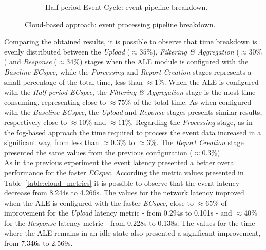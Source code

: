 \begin{figure}[ht!]
\begin{subfigure}{.5\textwidth}
    \caption{Half-period Event Cycle: event pipeline breakdown.}
    \label{fig:ecspecf_effective_half}
  \end{subfigure}
  \caption[Cloud-based approach: event processing breakdown.]{Cloud-based approach: event processing pipeline breakdown.}
  \label{fig:ecspecf_effective_breakdown}
\end{figure}

Comparing the obtained results, it is possible to observe that time breakdown is evenly distributed
between the \textit{Upload} ($\approx35\%$), \textit{Filtering \& Aggregation} ($\approx30\%$) and
\textit{Response} ($\approx34\%$) stages when the \gls{ALE} module is configured with the \textit{Baseline ECspec},
while the \textit{Porcessing} and \textit{Report Creation} stages represents a small percentage of the
total time, less than $\approx1\%$. When the \gls{ALE} is configured with the \textit{Half-period ECspec},
the \textit{Filtering \& Aggregation} stage is the most time consuming, representing close to $\approx 75\%$
of the total time. As when configured with the \textit{Baseline ECspec}, the \textit{Upload} and
\textit{Reponse} stages presents similar results, respectively close to $\approx10\%$ and $\approx11\%$.
Regarding the \textit{Processing} stage, as in the fog-based approach the time required to process the
event data increased in a significant way, from less than $\approx0.3\%$ to $\approx3\%$. The
\textit{Report Creation} stage presented the same values from the previous configuration ($\approx0.3\%$).\\

As in the previous experiment the event latency presented a better overall performance for the faster \textit{ECspec}.
According the metric values presented in Table~\ref{table:cloud_metrics} it is possible to observe that the event
latency decrease from 8.244s to 4.266s. The values for the network latency improved when the \gls{ALE} is
configured with the faster \textit{ECspec}, close to $\approx65\%$ of improvement for the \textit{Upload}
latency metric - from 0.294s to 0.101s - and $\approx40\%$ for the \textit{Response} latency metric -
from 0.228s to 0.138s. The values for the time where the \gls{ALE} remains in an idle state also presented
a significant improvement, from 7.346s to 2.569s.\\

